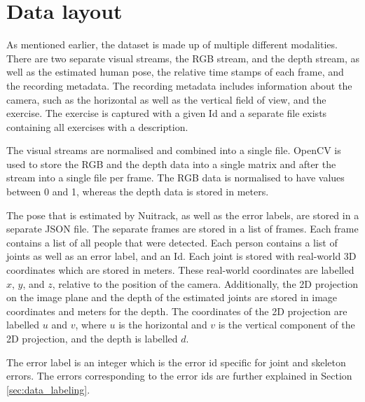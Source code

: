 \section{Data layout}

As mentioned earlier, the dataset is made up of multiple different modalities. There are two separate visual streams, the RGB stream, and the depth stream, as well as the estimated human pose, the relative time stamps of each frame, and the recording metadata. The recording metadata includes information about the camera, such as the horizontal as well as the vertical field of view, and the exercise. The exercise is captured with a given Id and a separate file exists containing all exercises with a description.

The visual streams are normalised and combined into a single file. OpenCV is used to store the RGB and the depth data into a single matrix and after the stream into a single file per frame. The RGB data is normalised to have values between 0 and 1, whereas the depth data is stored in meters.

The pose that is estimated by Nuitrack, as well as the error labels, are stored in a separate JSON file. The separate frames are stored in a list of frames. Each frame contains a list of all people that were detected. Each person contains a list of joints as well as an error label, and an Id. Each joint is stored with real-world 3D coordinates which are stored in meters. These real-world coordinates are labelled $x$, $y$, and $z$, relative to the position of the camera. Additionally, the 2D projection on the image plane and the depth of the estimated joints are stored in image coordinates and meters for the depth. The coordinates of the 2D projection are labelled $u$ and $v$, where $u$ is the horizontal and $v$ is the vertical component of the 2D projection, and the depth is labelled $d$.

The error label is an integer which is the error id specific for joint and skeleton errors. The errors corresponding to the error ids are further explained in Section \ref{sec:data_labeling}.
